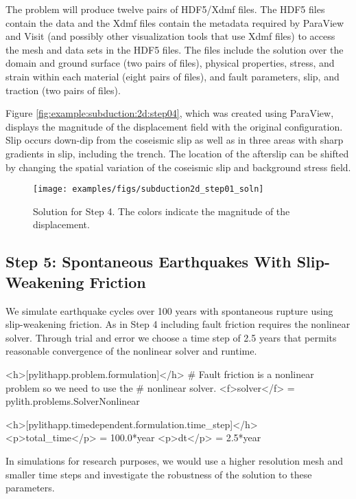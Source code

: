 The problem will produce twelve pairs of HDF5/Xdmf files. The HDF5
files contain the data and the Xdmf files contain the metadata required
by ParaView and Visit (and possibly other visualization tools that
use Xdmf files) to access the mesh and data sets in the HDF5 files.
The files include the solution over the domain and ground surface
(two pairs of files), physical properties, stress, and strain within
each material (eight pairs of files), and fault parameters, slip,
and traction (two pairs of files). 

Figure \vref{fig:example:subduction:2d:step04}, which was created using
ParaView, displays the magnitude of the displacement field with the
original configuration. Slip occurs down-dip from the coseismic slip
as well as in three areas with sharp gradients in slip, including
the trench. The location of the afterslip can be shifted by changing
the spatial variation of the coseismic slip and background stress
field.

\begin{figure}
  \texttt{[image: examples/figs/subduction2d\_step01\_soln]}
  \caption{Solution for Step 4. The colors indicate the magnitude of
    the displacement.}
  \label{fig:example:subduction:2d:step04}
\end{figure}


\subsection{Step 5: Spontaneous Earthquakes With Slip-Weakening Friction}

We simulate earthquake cycles over 100 years with spontaneous rupture
using slip-weakening friction. As in Step 4 including fault friction
requires the nonlinear solver. Through trial and error we choose a
time step of 2.5 years that permits reasonable convergence of the
nonlinear solver and runtime. 
\begin{cfg}
<h>[pylithapp.problem.formulation]</h>
# Fault friction is a nonlinear problem so we need to use the
# nonlinear solver.
<f>solver</f> = pylith.problems.SolverNonlinear

<h>[pylithapp.timedependent.formulation.time_step]</h>
<p>total_time</p> = 100.0*year
<p>dt</p> = 2.5*year
\end{cfg}
In simulations for research purposes, we
would use a higher resolution mesh and smaller time steps and
investigate the robustness of the solution to these parameters.

